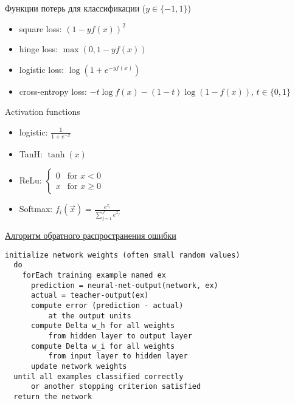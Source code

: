 \documentclass[landscape]{slides}
\begin{document}
\begin{slide}
Функции потерь для классификации ($y\in\{-1,1\}$)
\begin{itemize}
\item square loss: $(1-yf(x))^2$
\item hinge loss: $\max(0, 1-yf(x))$
\item logistic loss: $\log(1+e^{-yf(x)})$
\item cross-entropy loss: $-t\log f(x) - (1-t)\log(1-f(x))$, $t\in\{0,1\}$
\end{itemize}
\end{slide}


\begin{slide}
Activation functions
\begin{itemize}
\item logistic: $\displaystyle \frac 1{1+e^{-x}}$
\item TanH: $\tanh(x)$
\item ReLu:
$\displaystyle\left\{
\begin{array}{ll}
0 & {\mbox{for }} x<0\\
x & {\mbox{for }} x\geq 0
\end{array}\right.$
\item Softmax: ${\displaystyle f_{i}({\vec {x}})={\frac {e^{x_{i}}}{\sum _{j=1}^{J}e^{x_{j}}}}}$
\end{itemize}
\end{slide}


\begin{slide}
\href{https://en.wikipedia.org/wiki/Backpropagation}{Алгоритм обратного распространения ошибки}

\begin{verbatim}
initialize network weights (often small random values)
  do
    forEach training example named ex
      prediction = neural-net-output(network, ex)
      actual = teacher-output(ex)
      compute error (prediction - actual)
          at the output units
      compute Delta w_h for all weights
          from hidden layer to output layer
      compute Delta w_i for all weights
          from input layer to hidden layer 
      update network weights
  until all examples classified correctly
      or another stopping criterion satisfied
  return the network
\end{verbatim}
\end{slide}
\end{document}
